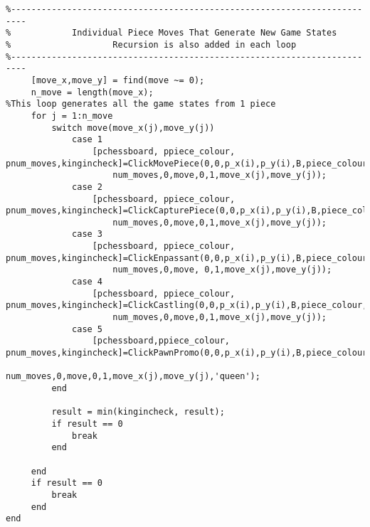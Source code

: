 \documentclass{article}
\begin{document}
\begin{lstlisting}
%-------------------------------------------------------------------------
%            Individual Piece Moves That Generate New Game States
%                    Recursion is also added in each loop
%-------------------------------------------------------------------------
     [move_x,move_y] = find(move ~= 0);
     n_move = length(move_x);
%This loop generates all the game states from 1 piece
     for j = 1:n_move
         switch move(move_x(j),move_y(j))
             case 1
                 [pchessboard, ppiece_colour, pnum_moves,kingincheck]=ClickMovePiece(0,0,p_x(i),p_y(i),B,piece_colour,chessboard,...
                     num_moves,0,move,0,1,move_x(j),move_y(j));
             case 2
                 [pchessboard, ppiece_colour, pnum_moves,kingincheck]=ClickCapturePiece(0,0,p_x(i),p_y(i),B,piece_colour,chessboard,...
                     num_moves,0,move,0,1,move_x(j),move_y(j));
             case 3
                 [pchessboard, ppiece_colour, pnum_moves,kingincheck]=ClickEnpassant(0,0,p_x(i),p_y(i),B,piece_colour,chessboard,...
                     num_moves,0,move, 0,1,move_x(j),move_y(j));
             case 4
                 [pchessboard, ppiece_colour, pnum_moves,kingincheck]=ClickCastling(0,0,p_x(i),p_y(i),B,piece_colour,chessboard,...
                     num_moves,0,move,0,1,move_x(j),move_y(j));
             case 5
                 [pchessboard,ppiece_colour, pnum_moves,kingincheck]=ClickPawnPromo(0,0,p_x(i),p_y(i),B,piece_colour,chessboard,...
                     num_moves,0,move,0,1,move_x(j),move_y(j),'queen');
         end
         
         result = min(kingincheck, result);
         if result == 0
             break
         end
         
     end
     if result == 0
         break
     end
end
\end{lstlisting}
\end{document}
